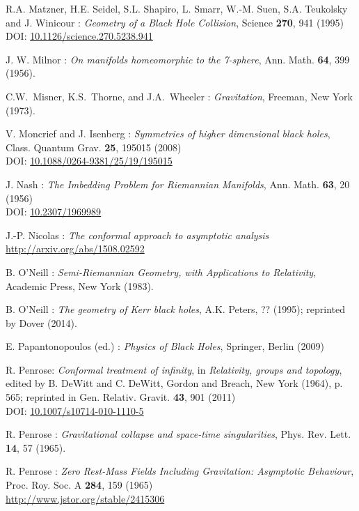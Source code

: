 \begin{thebibliography}{123}
R.A. Matzner, H.E. Seidel, S.L. Shapiro, L. Smarr, W.-M. Suen, S.A. Teukolsky and
J. Winicour : {\em Geometry of a Black Hole Collision},
Science {\bf 270}, 941 (1995)\\
DOI: \href{http://dx.doi.org/10.1126/science.270.5238.941}{10.1126/science.270.5238.941}

J. W. Milnor : {\em On manifolds homeomorphic to the 7-sphere},
Ann. Math. {\bf 64}, 399 (1956).

C.W.~Misner, K.S.~Thorne, and J.A.~Wheeler : {\em Gravitation},
Freeman, New York (1973).

V. Moncrief and J. Isenberg : {\em Symmetries of higher dimensional black holes},
Class. Quantum Grav. {\bf 25}, 195015 (2008)\\
DOI: \href{http://dx.doi.org/10.1088/0264-9381/25/19/195015}{10.1088/0264-9381/25/19/195015}

J. Nash  :
{\em The Imbedding Problem for Riemannian Manifolds},
Ann. Math. {\bf 63}, 20 (1956)\\
DOI: \href{http://dx.doi.org/10.2307/1969989}{10.2307/1969989}

J.-P. Nicolas :
{\em The conformal approach to asymptotic analysis} \\
\url{http://arxiv.org/abs/1508.02592}

B. O'Neill : {\em Semi-Riemannian Geometry, with Applications to Relativity},
Academic Press, New York (1983).

B. O'Neill : {\em The geometry of Kerr black holes}, A.K. Peters, ?? (1995);
reprinted by Dover (2014).

E. Papantonopoulos (ed.) : {\em Physics of Black Holes}, Springer, Berlin (2009)

R. Penrose: {\em Conformal treatment of infinity}, in {\em Relativity, groups and topology},
edited by B. DeWitt and C. DeWitt,
Gordon and Breach, New York (1964), p. 565; reprinted in
Gen. Relativ. Gravit. {\bf 43}, 901 (2011)\\
DOI: \href{http://dx.doi.org/doi:10.1007/s10714-010-1110-5}{10.1007/s10714-010-1110-5}

R. Penrose : {\em Gravitational collapse and space-time singularities},
Phys. Rev. Lett. {\bf 14}, 57 (1965).

R. Penrose :
{\em Zero Rest-Mass Fields Including Gravitation: Asymptotic Behaviour},
Proc. Roy. Soc. A {\bf 284}, 159 (1965)\\
\url{http://www.jstor.org/stable/2415306}


\end{thebibliography}
